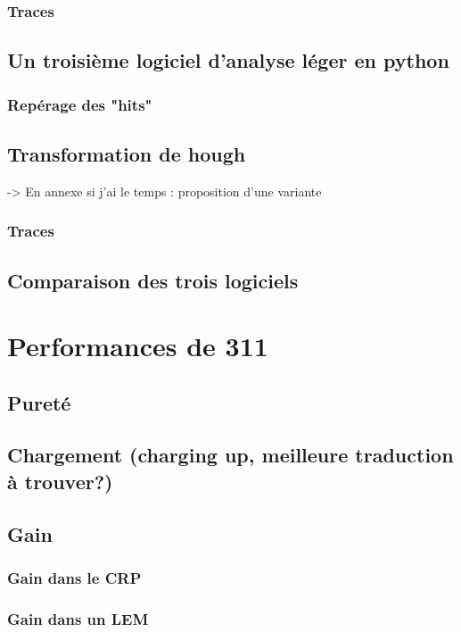             \subsubsection{Traces}
        \subsection{Un troisième logiciel d'analyse léger en python}\label{rawdatasoft}
            \subsubsection{Repérage des "hits"}
            \subsection{Transformation de hough}
                -> En annexe si j'ai le temps : proposition d'une variante
            \subsubsection{Traces}
        \subsection{Comparaison des trois logiciels}
        
    \section{Performances de 311}
        \subsection{Pureté}
        \subsection{Chargement (charging up, meilleure traduction à trouver?)}
        \subsection{Gain}
            \subsubsection{Gain dans le CRP}
            \subsubsection{Gain dans un LEM}
